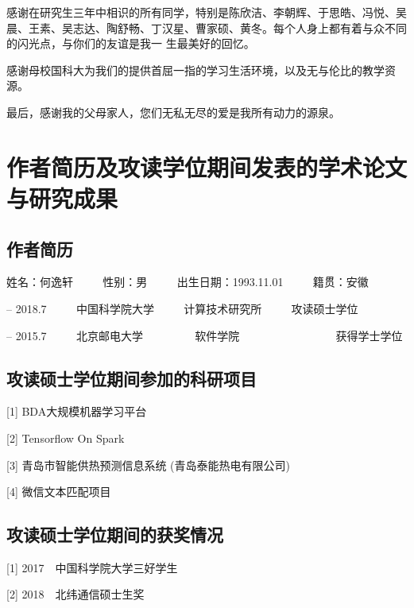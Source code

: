 感谢在研究生三年中相识的所有同学，特别是陈欣洁、李朝辉、于思皓、冯悦、吴晨、王素、吴志达、陶舒畅、丁汉星、曹家硕、黄冬。每个人身上都有着与众不同的闪光点，与你们的友谊是我一 生最美好的回忆。

感谢母校国科大为我们的提供首屈一指的学习生活环境，以及无与伦比的教学资源。

最后，感谢我的父母家人，您们无私无尽的爱是我所有动力的源泉。

\chapter{作者简历及攻读学位期间发表的学术论文与研究成果}
\section*{作者简历}

\begin{center}
姓名：何逸轩 $\qquad$ 性别：男 $\qquad$ 出生日期：1993.11.01 $\qquad$ 籍贯：安徽\\
\end{center}

 -- 2018.7  $\qquad$  中国科学院大学 $\qquad$ 计算技术研究所 $\qquad$  攻读硕士学位

 -- 2015.7   $\qquad$ 北京邮电大学~~~~  $\qquad$ 软件学院~~~~~~~~~~~~ $\qquad$  获得学士学位

\section*{攻读硕士学位期间参加的科研项目} %
[1] BDA大规模机器学习平台

[2] Tensorflow On Spark

[3] 青岛市智能供热预测信息系统 (青岛泰能热电有限公司)

[4] 微信文本匹配项目

\section*{攻读硕士学位期间的获奖情况} %
[1] 2017~~中国科学院大学三好学生

[2] 2018~~北纬通信硕士生奖

\cleardoublepage[plain]%


